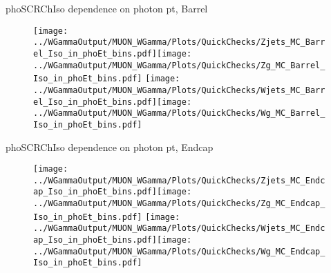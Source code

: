 \documentclass{beamer}
\begin{document}
\begin{frame}{phoSCRChIso dependence on photon pt, Barrel}
  \begin{figure}
    \centering
    \texttt{[image: ../WGammaOutput/MUON\_WGamma/Plots/QuickChecks/Zjets\_MC\_Barrel\_Iso\_in\_phoEt\_bins.pdf]}\texttt{[image: ../WGammaOutput/MUON\_WGamma/Plots/QuickChecks/Zg\_MC\_Barrel\_Iso\_in\_phoEt\_bins.pdf]}
    \texttt{[image: ../WGammaOutput/MUON\_WGamma/Plots/QuickChecks/Wjets\_MC\_Barrel\_Iso\_in\_phoEt\_bins.pdf]}\texttt{[image: ../WGammaOutput/MUON\_WGamma/Plots/QuickChecks/Wg\_MC\_Barrel\_Iso\_in\_phoEt\_bins.pdf]}
  \end{figure}
\end{frame}

\begin{frame}{phoSCRChIso dependence on photon pt, Endcap}
  \begin{figure}
    \centering
    \texttt{[image: ../WGammaOutput/MUON\_WGamma/Plots/QuickChecks/Zjets\_MC\_Endcap\_Iso\_in\_phoEt\_bins.pdf]}\texttt{[image: ../WGammaOutput/MUON\_WGamma/Plots/QuickChecks/Zg\_MC\_Endcap\_Iso\_in\_phoEt\_bins.pdf]}
    \texttt{[image: ../WGammaOutput/MUON\_WGamma/Plots/QuickChecks/Wjets\_MC\_Endcap\_Iso\_in\_phoEt\_bins.pdf]}\texttt{[image: ../WGammaOutput/MUON\_WGamma/Plots/QuickChecks/Wg\_MC\_Endcap\_Iso\_in\_phoEt\_bins.pdf]}
  \end{figure}
\end{frame}
\end{document}
